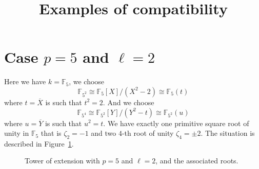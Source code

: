 \documentclass[a4paper,11pt]{article}
\title{Examples of compatibility}
\author{}
\begin{document}
\maketitle





\section{Case $p=5$ and $\ell=2$}
\label{sec:p5l2}

Here we have $k=\mathbb{F}_5$,
we choose
\[
  \mathbb{F}_{5^2}\cong\mathbb{F}_5[X]/(X^2-2)\cong\mathbb{F}_5(t)
\]
where
$t=\overline X$ is such that $t^2=2$. And we choose 
\[
  \mathbb{F}_{5^4}\cong
\mathbb{F}_{5^2}[Y]/(Y^2-t)\cong \mathbb{F}_{5^2}(u)
\]
where $u=\overline
Y$ is such that $u^2 = t$. We have exactly one primitive square root of
unity in $\mathbb{F}_5$ that is $\zeta_2 = -1$ and two $4$-th
root of unity $\zeta_4=\pm 2$. The situation is described in
Figure~\ref{fig:p5l2}.

\begin{figure}
  \centering
{}
\phantom{and}
  \caption{Tower of extension with $p=5$ and $\ell=2$, and the associated roots.}
  \label{fig:p5l2}
\end{figure}
\end{document}
